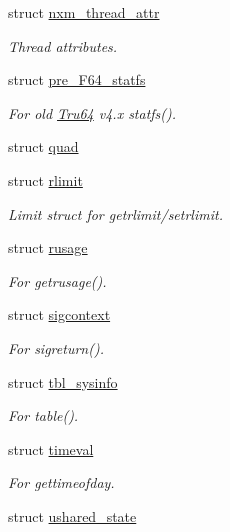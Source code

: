 \begin{DoxyCompactItemize}
struct \hyperlink{structTru64_1_1nxm__thread__attr}{nxm\_\-thread\_\-attr}
\begin{DoxyCompactList}\small\item\em Thread attributes. \item\end{DoxyCompactList}\item 
struct \hyperlink{structTru64_1_1pre__F64__statfs}{pre\_\-F64\_\-statfs}
\begin{DoxyCompactList}\small\item\em For old \hyperlink{classTru64}{Tru64} v4.x statfs(). \item\end{DoxyCompactList}\item 
struct \hyperlink{structTru64_1_1quad}{quad}
\item 
struct \hyperlink{structTru64_1_1rlimit}{rlimit}
\begin{DoxyCompactList}\small\item\em Limit struct for getrlimit/setrlimit. \item\end{DoxyCompactList}\item 
struct \hyperlink{structTru64_1_1rusage}{rusage}
\begin{DoxyCompactList}\small\item\em For getrusage(). \item\end{DoxyCompactList}\item 
struct \hyperlink{structTru64_1_1sigcontext}{sigcontext}
\begin{DoxyCompactList}\small\item\em For sigreturn(). \item\end{DoxyCompactList}\item 
struct \hyperlink{structTru64_1_1tbl__sysinfo}{tbl\_\-sysinfo}
\begin{DoxyCompactList}\small\item\em For table(). \item\end{DoxyCompactList}\item 
struct \hyperlink{structTru64_1_1timeval}{timeval}
\begin{DoxyCompactList}\small\item\em For gettimeofday. \item\end{DoxyCompactList}\item 
struct \hyperlink{structTru64_1_1ushared__state}{ushared\_\-state}

\end{DoxyCompactItemize}
